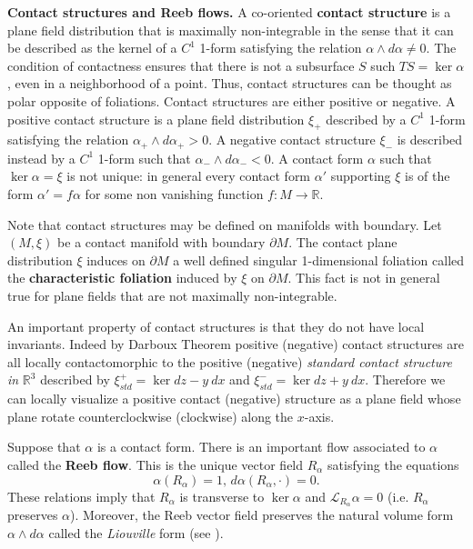 \documentclass{amsart}
\theoremstyle{definition}
\theoremstyle{remark}
\begin{document}
\textbf{Contact structures and Reeb flows.} A co-oriented \textbf{contact structure} is a plane field distribution that is maximally non-integrable in the sense that it can be described as the kernel of a $C^1$ 1-form satisfying the relation $\alpha\wedge d\alpha\neq0$. The condition of contactness ensures that there is not a subsurface $S$ such $TS=\ker \alpha$, even in a neighborhood of a point. Thus, contact structures can be thought as polar opposite of foliations. Contact structures are either positive or  negative. A positive contact structure is a plane field distribution $\xi_+$ described by a $C^1$ 1-form satisfying the relation $\alpha_+\wedge d\alpha_+>0$. A negative contact structure $\xi_-$ is described instead by a $C^1$ 1-form such that $\alpha_-\wedge d\alpha_-<0$. A contact form $\alpha$ such that $\ker \alpha=\xi$ is not unique: in general every contact form $\alpha'$ supporting $\xi$ is of the form $\alpha'=f\alpha$ for some non vanishing function $f:M\rightarrow \mathbb{R}$.

Note that contact structures may be defined on manifolds with boundary. Let $(M,\xi)$ be a contact manifold with boundary $\partial M$. The contact plane distribution $\xi$ induces on $\partial M$ a well defined singular 1-dimensional foliation called the \textbf{characteristic foliation} induced by $\xi$ on $\partial M$. This fact is not in general true for plane fields that are not maximally non-integrable.

An important property of contact structures is that they do not have local invariants. Indeed by Darboux Theorem positive (negative) contact structures are all locally contactomorphic to the positive (negative) {\it standard contact structure in} $\mathbb{R} ^3$ described by $\xi_{std}^+=\ker dz-y\:dx$ and $\xi_{std}^-=\ker dz+y\:dx$. Therefore we can locally visualize a positive contact (negative) structure as a plane field whose plane rotate counterclockwise (clockwise) along the $x$-axis. 

Suppose that $\alpha$ is a contact form. There is an important flow associated to $\alpha$ called the \textbf{Reeb flow}. This is the unique vector field $R_{\alpha}$ satisfying the equations
\[
\alpha(R_{\alpha})=1,\,d\alpha(R_{\alpha},\cdot)=0.
\]
These relations imply that $R_{\alpha}$ is transverse to $\ker \alpha$ and $\mathcal{L}_{R_{\alpha}}\alpha=0$ (i.e. $R_{\alpha}$ preserves $\alpha$). Moreover, the Reeb vector field preserves the natural volume form $\alpha\wedge d\alpha$ called the {\it Liouville} form (see \cite{Et04}).
\\
\end{document}
